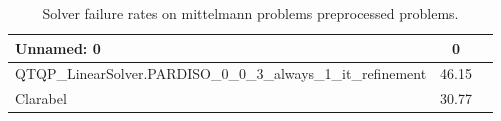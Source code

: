 \begin{table}
\caption{Solver failure rates on mittelmann problems preprocessed problems.}
\label{t-mittelmann problems preprocessed-failure}
\begin{tabular}{lcc}
\toprule
Unnamed: 0 & 0 \\
\midrule
QTQP_LinearSolver.PARDISO_0_0_3_always_1_it_refinement & 46.15 \\
Clarabel & 30.77 \\
\bottomrule
\end{tabular}
\end{table}
